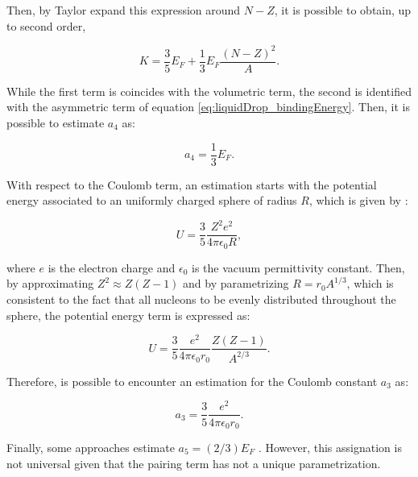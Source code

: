 \documentclass[openany]{book}
\begin{document}
Then, by Taylor expand this expression around $N - Z$, it is possible to obtain, up to second order, 

\begin{equation}\label{eq:liquidDrop_FermiGas_asymmetric_approx}
	K = \frac{3}{5}E_F + \frac{1}{3}E_F \frac{(N - Z)^{2}}{A}. 
\end{equation}

While the first term is coincides with the volumetric term, the second is identified with the asymmetric term of equation \ref{eq:liquidDrop_bindingEnergy}. Then, it is possible to estimate $a_4$ as: 

\begin{equation}\label{eq:liquidDrop_FermiGas_asymmetricConstant}
	a_4 = \frac{1}{3}E_F.
\end{equation}

With respect to the Coulomb term, an estimation starts with the potential energy associated to an uniformly charged sphere of radius $R$, which is given by \cite{bohr_mottelson_1998}:

\begin{equation}\label{eq:liquidDrop_FermiGas_coulombEnergy}
	U = \frac{3}{5} \frac{Z^2e^2}{4\pi\epsilon_0 R},
\end{equation}

where $e$ is the electron charge and  $\epsilon_0 $ is the vacuum permittivity constant. Then, by approximating $Z^2 \approx Z(Z-1)$ and by parametrizing $R = r_0A^{1/3}$, which is consistent to the fact that all nucleons to be evenly distributed throughout the sphere, the potential energy term is expressed as: 

 \begin{equation}\label{eq:liquidDrop_FermiGas_coulombEnergy_approximate}
 	U = \frac{3}{5} \frac{e^2}{4\pi\epsilon_0 r_0} \frac{Z(Z-1)}{A^{2/3}}.
 \end{equation}

Therefore, is possible to encounter an estimation for the Coulomb constant $a_3$ as:

 \begin{equation}\label{eq:liquidDrop_FermiGas_coulombConstant}
	a_3 = \frac{3}{5} \frac{e^2}{4 \pi \epsilon_0 r_0}.
\end{equation}

Finally, some approaches estimate $a_5 = (2/3)E_F$ \cite{bohr_mottelson_1998}. However, this assignation is not universal given that the pairing term has not a unique parametrization. \\
\end{document}

